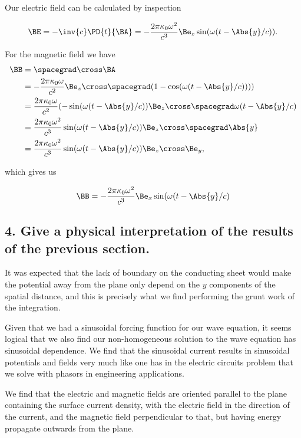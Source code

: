 Our electric field can be calculated by inspection

\begin{equation}\label{eqn:relElectroDynProblemSet5P1:190}
\BE 
= -\inv{c}\PD{t}{\BA}
= -\frac{
2 \pi \kappa_0 \omega^2
}{c^3} \Be_z \sin(\omega(t - \Abs{y}/c)).
\end{equation}

For the magnetic field we have
\begin{align*}
\BB 
&= \spacegrad \cross \BA \\
&= -\frac{
2 \pi \kappa_0 \omega
}{c^2} \Be_z \cross \spacegrad (1 -\cos(\omega(t - \Abs{y}/c)))) \\
&= \frac{
2 \pi \kappa_0 \omega
}{c^2} 
(-\sin(\omega(t - \Abs{y}/c))
\Be_z \cross \spacegrad \omega(t - \Abs{y}/c) \\
&= \frac{
2 \pi \kappa_0 \omega^2
}{c^3} 
\sin(\omega(t - \Abs{y}/c))
\Be_z \cross 
 \spacegrad \Abs{y} \\
&= \frac{
2 \pi \kappa_0 \omega^2
}{c^3} 
\sin(\omega(t - \Abs{y}/c)) 
\Be_z \cross \Be_y,
\end{align*}

which gives us

\begin{equation}\label{eqn:relElectroDynProblemSet5P1:210}
\BB 
= 
-\frac{
2 \pi \kappa_0 \omega^2
}{c^3}
\Be_x \sin(\omega(t - \Abs{y}/c) 
\end{equation}

\subsection{4. Give a physical interpretation of the results of the previous section.}

It was expected that the lack of boundary on the conducting sheet would make the potential away from the plane only depend on the $y$ components of the spatial distance, and this is precisely what we find performing the grunt work of the integration.  

Given that we had a sinusoidal forcing function for our wave equation, it seems logical that we also find our non-homogeneous solution to the wave equation has sinusoidal dependence.  We find that the sinusoidal current results in sinusoidal potentials and fields very much like one has in the electric circuits problem that we solve with phasors in engineering applications.

We find that the electric and magnetic fields are oriented parallel to the plane containing the surface current density, with the electric field in the direction of the current, and the magnetic field perpendicular to that, but having energy propagate outwards from the plane.

